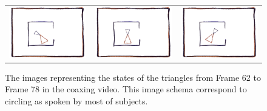 \def\DevnagVersion{2.15}\documentclass[a4paper, 11pt, notitlepage]{report}
\begin{document}
\begin{figure}[h]
\begin{tabular}{ccc}
\includegraphics[scale=0.3]{image/0072.png} & 
\includegraphics[scale=0.3]{image/0074.png} &
\includegraphics[scale=0.3]{image/0078.png}\\
\end{tabular}
\label{tab:gt}
\caption{The images representing the states of the triangles from Frame 62 to Frame 78 in the coaxing video. This image schema correspond to circling as spoken by most of subjects.}
\end{figure}
\end{document}
